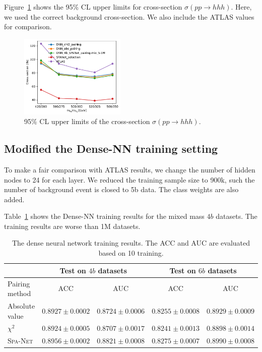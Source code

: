 \documentclass[12pt]{article}
\begin{document}
        Figure~\ref{fig:cross_section_upper_limit-TRSM-mix_5-1M} shows the 95\% CL upper limits for cross-section $\sigma\left( pp \to hhh \right)$. Here, we used the correct background cross-section. We also include the ATLAS values for comparison.
        \begin{figure}[htpb]
            \centering
            \includegraphics[width=0.45\textwidth]{cross_section_upper_limit-TRSM-mix_5-1M-ATLAS.pdf}
            \caption{95\% CL upper limits of the cross-section $\sigma\left( pp \to hhh \right)$.}
            \label{fig:cross_section_upper_limit-TRSM-mix_5-1M}
        \end{figure}
    \subsection{Modified the Dense-NN training setting}%
    \label{sub:modified_the_dense_nn_training_setting}
        To make a fair comparison with ATLAS results, we change the number of hidden nodes to 24 for each layer. We reduced the training sample size to 900k, such the number of background event is closed to 5b data. The class weights are also added.  

        Table~\ref{tab:DNN_training_results_mix_5-150k-4b-TRSM} shows the Dense-NN training results for the mixed mass $4b$ datasets. The training results are worse than 1M datasets.
        \begin{table}[htpb]
            \centering
            \caption{The dense neural network training results. The ACC and AUC are evaluated based on 10 training.}
            \label{tab:DNN_training_results_mix_5-150k-4b-TRSM}
            \begin{tabular}{l|cc|cc}
                             & \multicolumn{2}{c|}{Test on $4b$ datasets}& \multicolumn{2}{c}{Test on $6b$ datasets} \\ \hline
            Pairing method   & ACC                 & AUC                 & ACC                 & AUC                 \\ \hline
            Absolute value   & $0.8927 \pm 0.0002$ & $0.8724 \pm 0.0006$ & $0.8255 \pm 0.0008$ & $0.8929 \pm 0.0009$ \\
            $\chi^2$         & $0.8924 \pm 0.0005$ & $0.8707 \pm 0.0017$ & $0.8241 \pm 0.0013$ & $0.8898 \pm 0.0014$ \\
            \textsc{Spa-Net} & $0.8956 \pm 0.0002$ & $0.8821 \pm 0.0008$ & $0.8275 \pm 0.0007$ & $0.8990 \pm 0.0008$
            \end{tabular}
        \end{table}
\end{document}
